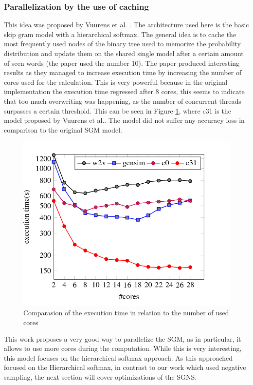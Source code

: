 \subsubsection{Parallelization by the use of caching}
This idea was proposed by Vuurens et al. \cite{efficient}. The architecture used here is the basic skip gram model with a hierarchical softmax.  The general idea is to cache the most frequently used nodes of the binary tree used to memorize the probability distribution and update them on the shared single model after a certain amount of seen words (the paper used the number 10). The paper produced interesting results as they managed to increase execution time by increasing the number of cores used for the calculation. This is very powerful because in the original implementation the execution time regressed after 8 cores, this seems to indicate that too much overwriting was happening, as the number of concurrent threads surpasses a certain threshold. This can be seen in Figure \ref{fig:efficient}, where c31 is the model proposed by Vuurens et al.\cite{efficient}. The model did not suffer any accuracy loss in comparison to the original SGM model. 
\begin{figure}[ht]
    \centering
            \includegraphics[scale=0.3]{images/cachingEfficiency.png} 
    \caption{Comparasion of the execution time in relation to the number of used cores \cite{efficient}}
    \label{fig:efficient}
\end{figure}
This work proposes a very good way to parallelize the SGM, as in particular, it allows to use more cores during the computation. While this is very interesting, this model focuses on the hierarchical softmax approach. As this approached focused on the Hierarchical softmax, in contrast to our work which used negative sampling, the next section will cover optimizations of the SGNS. 

